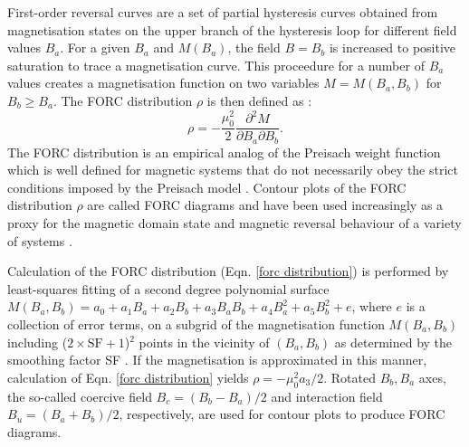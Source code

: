 First-order reversal curves are a set of partial hysteresis curves obtained from magnetisation states on the upper branch of the hysteresis loop for different field values $B_a$. For a given $B_a$ and $M(B_a)$, the field $B=B_b$ is increased to positive saturation to trace a magnetisation curve. This proceedure for a number of $B_a$ values creates a magnetisation function on two variables $M=M(B_a,B_b)$ for $B_b \geq B_a$. The FORC distribution $\rho$ is then defined as \citep{Roberts2000}:
\begin{equation}\label{forc distribution}
\rho = -\frac{\mu_0^2}{2}\frac{\partial^2 M}{\partial B_a \partial B_b}.
\end{equation}
The FORC distribution is an empirical analog of the Preisach weight function which is well defined for magnetic systems that do not necessarily obey the strict conditions imposed by the Preisach model \citep{Mayergoyz1986}. Contour plots of the FORC distribution $\rho$ are called FORC diagrams and have been used increasingly as a proxy for the magnetic domain state and magnetic reversal behaviour of a variety of systems \citep{Pike1999,Pike2001,Roberts2000,Dumas2007,Egli2010,Egli2014,Biasi2016,Proenca2017,Zhao2017}.\par

Calculation of the FORC distribution (Eqn. \ref{forc distribution}) is performed by least-squares fitting of a second degree polynomial surface $M(B_a,B_b)=a_0 + a_1 B_a + a_2 B_b + a_3 B_a B_b + a_4 B_a^2 + a_5 B_b^2 + e$, where $e$ is a collection of error terms, on a subgrid of the magnetisation function $M(B_a,B_b)$ including ($2\times\text{SF}+1$)$^2$ points in the vicinity of $(B_a, B_b)$ as determined by the smoothing factor SF \citep{Pike1999}. If the magnetisation is approximated in this manner, calculation of Eqn. \ref{forc distribution} yields $\rho=-\mu_0^2 a_3 / 2$. Rotated $B_b,B_a$ axes, the so-called coercive field $B_c = (B_b - B_a)/2$ and interaction field $B_u = (B_a + B_b)/2$, respectively, are used for contour plots to produce FORC diagrams.\par

